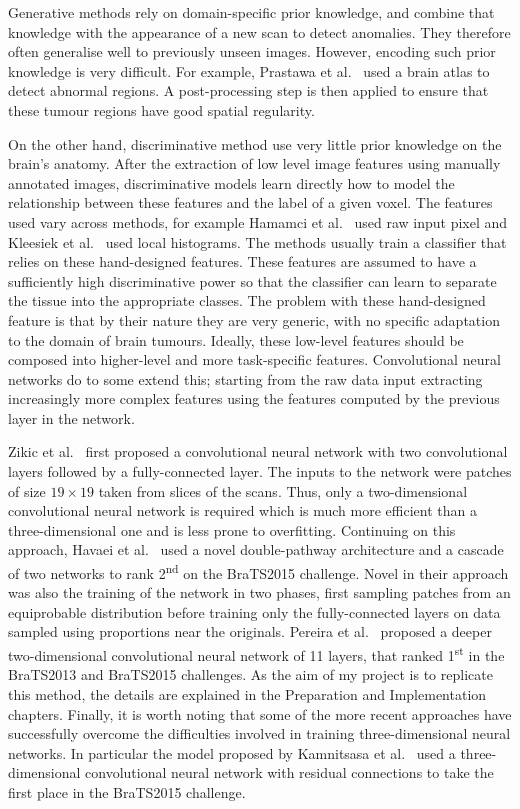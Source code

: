 \documentclass[12pt,a4paper,twoside,openright]{report}
\begin{document}
Generative methods rely on domain-specific prior knowledge, and combine that knowledge with the appearance of a new scan to detect anomalies. They therefore often generalise well to previously unseen images. However, encoding such prior knowledge is very difficult. For example, Prastawa et al.\ \cite{prastawa} used a brain atlas to detect abnormal regions. A post-processing step is then applied to ensure that these tumour regions have good spatial regularity.

On the other hand, discriminative method use very little prior knowledge on the brain's anatomy. After the extraction of low level image features using manually annotated images, discriminative models learn directly how to model the relationship between these features and the label of a given voxel. The features used vary across methods, for example Hamamci et al.\ \cite{hamamci} used raw input pixel and Kleesiek et al.\ \cite{kleesiek} used local histograms. The methods usually train a classifier that relies on these hand-designed features. These features are assumed to have a sufficiently high discriminative power so that the classifier can learn to separate the tissue into the appropriate classes. The problem with these hand-designed feature is that by their nature they are very generic, with no specific adaptation to the domain of brain tumours. Ideally, these low-level features should be composed into higher-level and more task-specific features. Convolutional neural networks do to some extend this; starting from the raw data input extracting increasingly more complex features using the features computed by the previous layer in the network.

Zikic et al.\ \cite{zikic} first proposed a convolutional neural network with two convolutional layers followed by a fully-connected layer. The inputs to the network were patches of size $19 \times 19$ taken from slices of the scans. Thus, only a two-dimensional convolutional neural network is required which is much more efficient than a three-dimensional one and is less prone to overfitting. Continuing on this approach, Havaei et al.\ \cite{havaei} used a novel double-pathway architecture and a cascade of two networks to rank 2\textsuperscript{nd} on the BraTS2015 challenge. Novel in their approach was also the training of the network in two phases, first sampling patches from an equiprobable distribution before training only the fully-connected layers on data sampled using proportions near the originals. Pereira et al.\ \cite{pereira} proposed a deeper two-dimensional convolutional neural network of 11 layers, that ranked 1\textsuperscript{st} in the BraTS2013 and BraTS2015 challenges. As the aim of my project is to replicate this method, the details are explained in the Preparation and Implementation chapters. Finally, it is worth noting that some of the more recent approaches have successfully overcome the difficulties involved in training three-dimensional neural networks. In particular the model proposed by Kamnitsasa et al.\ \cite{kamnitsas} used a three-dimensional convolutional neural network with residual connections \cite{resnet} to take the first place in the BraTS2015 challenge.
\end{document}
